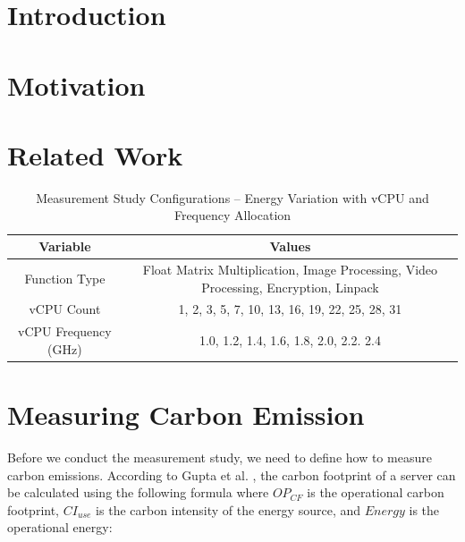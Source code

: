 \documentclass[times, 10pt,twocolumn]{article}
\begin{document}
\section{Introduction}


\section{Motivation}

\section{Related Work}

\begin{table}[htbp]
   \centering
   \begin{tabular}{|c|c|}
   \hline
   \textbf{Variable} & \textbf{Values} \\ \hline
   Function Type & Float Matrix Multiplication, Image Processing, Video Processing, Encryption, Linpack \\ \hline
   vCPU Count & 1, 2, 3, 5, 7, 10, 13, 16, 19, 22, 25, 28, 31 \\ \hline
   vCPU Frequency (GHz) & 1.0, 1.2, 1.4, 1.6, 1.8, 2.0, 2.2. 2.4 \\ \hline
   \end{tabular}
   \caption{Measurement Study Configurations -- Energy Variation with vCPU and Frequency Allocation}
   \label{tab:mstudy1_configurations}
\end{table}

\section{Measuring Carbon Emission}


Before we conduct the measurement study, we need to define how to measure carbon emissions. According to Gupta et al. \cite{gupta2022act}, the carbon footprint of a server can be calculated using the following formula where $OP_{CF}$ is the operational carbon footprint, $CI_{use}$ is the carbon intensity of the energy source, and $Energy$ is the operational energy:
\end{document}
